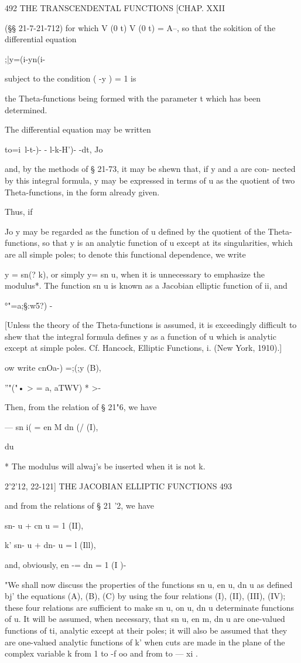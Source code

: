 492 THE TRANSCENDENTAL FUNCTIONS [CHAP. XXII

(§§ 21-7-21-712) for which V (0 t) V (0 t) = A--, so that the sokition
of the differential equation

;|y=(i-yn(i-%

subject to the condition ( -y ) = 1 is

the Theta-functions being formed with the parameter t which has been
determined.

The differential equation may be written

to=i\ l-t-)- - l-k-H')- -dt, Jo

and, by the methods of § 21-73, it may be shewn that, if y and a are
con- nected by this integral formula, y may be expressed in terms of u
as the quotient of two Theta-functions, in the form already given.

Thus, if

Jo y may be regarded as the function of u defined by the quotient of
the Theta- functions, so that y is an analytic function of u except at
its singularities, which are all simple poles; to denote this
functional dependence, we write

y = sn(? k), or simply y= sn u, when it is unnecessary to emphasize
the modulus*. The function sn u is known as a Jacobian elliptic
function of ii, and

 °"=a;§:w5?) -

[Unless the theory of the Theta-functions is assumed, it is
exceedingly difficult to shew that the integral formula defines y as a
function of u which is analytic except at simple poles. Cf. Hancock,
Elliptic Functions, i. (New York, 1910).]

 ow write cnOa-) =;(;y (B),

''"("• > = a, aTWV) * >-

Then, from the relation of § 21"6, we have

 — sn i( = en M dn (/ (I),

du

* The modulus will alwaj's be iuserted when it is not k.

2'2'12, 22-121] THE JACOBIAN ELLIPTIC FUNCTIONS 493

and from the relations of § 21 '2, we have

sn- u + cn u = 1 (II),

k' sn- u + dn- u = l (Ill),

and, obviously, en -= dn = 1 (I )-

"We shall now discuss the properties of the functions sn u, en u, dn u
as defined bj' the equations (A), (B), (C) by using the four relations
(I), (II), (III), (IV); these four relations are sufficient to make
sn u, on u, dn u determinate functions of u. It will be assumed, when
necessary, that sn u, en m, dn u are one-valued functions of ti,
analytic except at their poles; it will also be assumed that they are
one-valued analytic functions of k' when cuts are made in the plane of
the complex variable k from 1 to -f oo and from to — xi .

